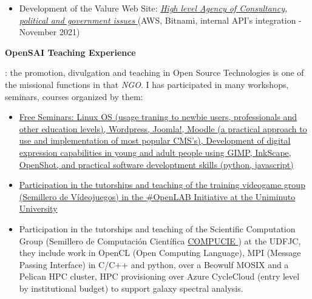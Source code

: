 \documentclass[overlapped,line,final]{res}
\begin{document}
\begin{resume}
\begin{position}
\begin{itemize}
		\item Development of the Valure Web Site: \href{https://valure.com.co}{\textit{High level Agency of Consultancy, political and government issues} } (AWS, Bitnami, internal API's integration - November 2021)
	\end{itemize}
\newpage
\opening
\textbf{OpenSAI Teaching Experience}: the promotion, divulgation and teaching in Open Source Technologies is one of the missional functions in that \textit{NGO}. I has participated in many workshops, seminars, courses organized by them:
\begin{itemize}
	\item \href{https://opensai.org/tags/talleres}{Free Seminars: Linux OS (usage traning to newbie users, professionals and other education levels), Wordpress, Joomla!, Moodle (a practical approach to use and implementation of most popular CMS's), Development of digital expression capabilities in young and adult people using GIMP, InkScape, OpenShot, and practical software developtment skills (python, javascript) {}}
	\item \href{https://opensai.org/tags/videojuegos}{Participation in the tutorships and teaching of the training videogame group (Semillero de Vídeojuegos) in the \#OpenLAB Initiative at the Uniminuto University }
	\item Participation in the tutorships and teaching of the Scientific Computation Group (Semillero de Computación Científica  \href{http://chronos.udistrital.edu.co:8095/siciud/web/Consultas.x?accion=5&idSemillero=2382}{COMPUCIE } ) at the UDFJC, they include work in OpenCL (Open Computing Language), MPI (Message Passing Interface) in C/C++ and python, over a Beowulf MOSIX and a Pelican HPC cluster, HPC provisioning over Azure CycleCloud (entry level by institutional budget) to support galaxy spectral analysis.
	\end{itemize}
\end{position}


\end{resume}
\end{document}
